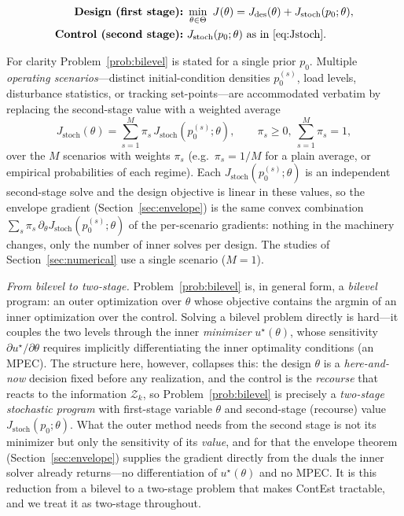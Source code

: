 \documentclass[twocolumn,amsthm]{autart}
\begin{document}
\begin{prob}[ContEst]\label{prob:bilevel}
\begin{align*}
\textbf{Design (first stage):}\ &\min_{\theta \in \Theta}\
J(\theta) = J_{\mathrm{des}}(\theta) + J_{\mathrm{stoch}}(p_0;\theta),\\
\textbf{Control (second stage):}\ & J_{\mathrm{stoch}}(p_0;\theta)\ \text{as in
\eqref{eq:Jstoch}}.
\end{align*}
\end{prob}

\begin{rem}\label{rem:scenarios}
For clarity Problem~\ref{prob:bilevel} is stated for a single prior $p_0$. Multiple
\emph{operating scenarios}---distinct initial-condition densities $p_0^{(s)}$, load
levels, disturbance statistics, or tracking set-points---are accommodated verbatim
by replacing the second-stage value with a weighted average
\begin{equation}\label{eq:scenario-avg}
J_{\mathrm{stoch}}(\theta)=\sum_{s=1}^{M}\pi_s\,J_{\mathrm{stoch}}(p_0^{(s)};\theta),
\qquad \pi_s\ge0,\ \textstyle\sum_{s=1}^{M}\pi_s=1,
\end{equation}
over the $M$ scenarios with weights $\pi_s$ (e.g.\ $\pi_s=1/M$ for a plain
average, or empirical probabilities of each regime). Each
$J_{\mathrm{stoch}}(p_0^{(s)};\theta)$ is an independent second-stage solve and the
design objective is linear in these values, so the envelope gradient
(Section~\ref{sec:envelope}) is the same convex combination
$\sum_s\pi_s\,\partial_\theta J_{\mathrm{stoch}}(p_0^{(s)};\theta)$ of the
per-scenario gradients: nothing in the machinery changes, only the number of inner
solves per design. The studies of Section~\ref{sec:numerical} use a single scenario
($M=1$).
\end{rem}

\emph{From bilevel to two-stage.} Problem~\ref{prob:bilevel} is, in general form,
a \emph{bilevel} program: an outer optimization over $\theta$ whose objective
contains the argmin of an inner optimization over the control. Solving a bilevel
problem directly is hard---it couples the two levels through the inner
\emph{minimizer} $u^\star(\theta)$, whose sensitivity $\partial u^\star/\partial
\theta$ requires implicitly differentiating the inner optimality conditions (an
MPEC). The structure here, however, collapses this: the design $\theta$ is a
\emph{here-and-now} decision fixed before any realization, and the control is the
\emph{recourse} that reacts to the information $\mathcal{Z}_k$, so
Problem~\ref{prob:bilevel} is precisely a \emph{two-stage stochastic program}
with first-stage variable $\theta$ and second-stage (recourse) value
$J_{\mathrm{stoch}}(p_0;\theta)$. What the outer method needs from the second
stage is not its minimizer but only the sensitivity of its \emph{value}, and for
that the envelope theorem (Section~\ref{sec:envelope}) supplies the gradient
directly from the duals the inner solver already returns---no differentiation of
$u^\star(\theta)$ and no MPEC. It is this reduction from a bilevel to a two-stage
problem that makes ContEst tractable, and we treat it as two-stage throughout.
\end{document}
